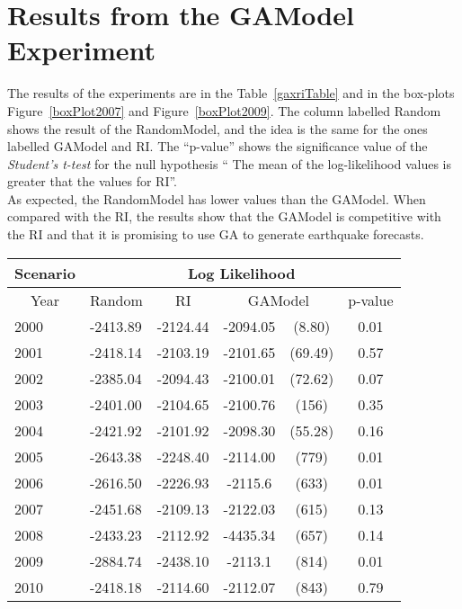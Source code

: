 
\section{Results from the GAModel Experiment}

The results of the experiments are in the Table~\ref{gaxriTable} and in the box-plots Figure~\ref{boxPlot2007} and Figure~\ref{boxPlot2009}. The column labelled Random shows the result of the RandomModel, and the idea is the same for the ones labelled GAModel and RI. The ``p-value'' shows the significance value of the {\it Student's t-test} for the null hypothesis `` The mean of the log-likelihood values is greater that the values for RI''.\\

As expected, the RandomModel has lower values than the GAModel. When compared with the RI, the results show that the GAModel is competitive with the RI and that it is promising to use GA to generate earthquake forecasts.\\

\begin{table*}[!ht]
	\begin{center}
		\begin{tabular}{|l|l|c|cc|c|}
			\hline
			\multicolumn{1}{|c|}{Scenario} & \multicolumn{5}{|c|}{Log Likelihood} \\
			\hline
			\multicolumn{1}{|c|}{Year} & \multicolumn{1}{|c|}{Random} & \multicolumn{1}{|c|}{RI} & \multicolumn{2}{c}{GAModel} & \multicolumn{1}{|c|}{p-value} \\    
			\hline
			2000 &-2413.89 &-2124.44 &\raggedright  -2094.05 &\raggedleft (8.80) & 0.01\\%
			2001 &-2418.14 &-2103.19 &\raggedright  -2101.65 &\raggedleft  (69.49) & 0.57\\%
			2002 &-2385.04 &-2094.43 &\raggedright  -2100.01 &\raggedleft (72.62) & 0.07\\%
			2003 &-2401.00 &-2104.65 &\raggedright  -2100.76 &\raggedleft (156) & 0.35\\%
			2004 &-2421.92 &-2101.92 &\raggedright  -2098.30 &\raggedleft (55.28) & 0.16\\%
			2005 &-2643.38 &-2248.40 &\raggedright  -2114.00 &\raggedleft (779) & 0.01\\%
			2006 &-2616.50 &-2226.93 &\raggedright  -2115.6 &\raggedleft (633) & 0.01\\%
			2007 &-2451.68 &-2109.13 &\raggedright  -2122.03 &\raggedleft (615) &  0.13\\%
			2008 &-2433.23 &-2112.92 &\raggedright  -4435.34 &\raggedleft (657) & 0.14\\%
			2009 &-2884.74 &-2438.10 &\raggedright  -2113.1 &\raggedleft (814) & 0.01\\%
			2010 &-2418.18 &-2114.60 &\raggedright -2112.07 &\raggedleft (843) & 0.79\\%
			\hline
		\end{tabular}
	\end{center}
	\caption{Experiments result.}
	\label{gaxriTable}
\end{table*}

